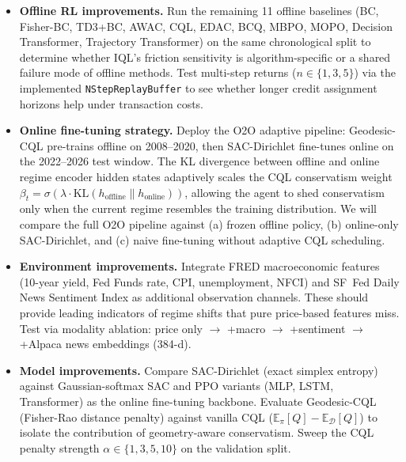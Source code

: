 \begin{itemize}[noitemsep, topsep=0pt]
\item \textbf{Offline RL improvements.}
      Run the remaining 11 offline baselines (BC, Fisher-BC, TD3+BC,
      AWAC, CQL, EDAC, BCQ, MBPO, MOPO, Decision Transformer,
      Trajectory Transformer) on the same chronological split to
      determine whether IQL's friction sensitivity is algorithm-specific
      or a shared failure mode of offline methods.  Test multi-step
      returns ($n \in \{1, 3, 5\}$) via the implemented
      \texttt{NStepReplayBuffer} to see whether longer credit
      assignment horizons help under transaction costs.

\item \textbf{Online fine-tuning strategy.}
      Deploy the O2O adaptive pipeline: Geodesic-CQL pre-trains offline
      on 2008--2020, then SAC-Dirichlet fine-tunes online on the
      2022--2026 test window.  The KL divergence between offline and
      online regime encoder hidden states adaptively scales the CQL
      conservatism weight $\beta_t = \sigma(\lambda \cdot
      \mathrm{KL}(h_{\text{offline}} \| h_{\text{online}}))$, allowing
      the agent to shed conservatism only when the current regime
      resembles the training distribution.  We will compare the full O2O
      pipeline against (a) frozen offline policy, (b) online-only
      SAC-Dirichlet, and (c) naive fine-tuning without adaptive CQL
      scheduling.

\item \textbf{Environment improvements.}
      Integrate FRED macroeconomic features (10-year yield, Fed Funds
      rate, CPI, unemployment, NFCI) and SF~Fed Daily News Sentiment
      Index as additional observation channels.  These should provide
      leading indicators of regime shifts that pure price-based features
      miss.  Test via modality ablation: price only $\to$ +macro $\to$
      +sentiment $\to$ +Alpaca news embeddings (384-d).

\item \textbf{Model improvements.}
      Compare SAC-Dirichlet (exact simplex entropy) against
      Gaussian-softmax SAC and PPO variants (MLP, LSTM, Transformer) as
      the online fine-tuning backbone.  Evaluate Geodesic-CQL
      (Fisher-Rao distance penalty) against vanilla CQL
      ($\mathbb{E}_\pi[Q] - \mathbb{E}_{\mathcal{D}}[Q]$) to isolate the
      contribution of geometry-aware conservatism.  Sweep the CQL penalty
      strength $\alpha \in \{1, 3, 5, 10\}$ on the validation split.


\end{itemize}
